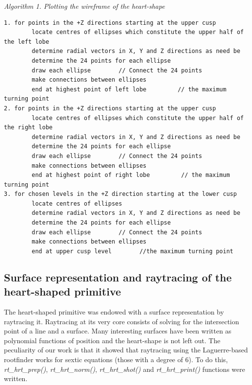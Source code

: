\hspace{50} \textit{Algorithm 1. Plotting the wireframe of the heart­-shape }
\footnotesize{\begin{verbatim}
1. for points in the +Z directions starting at the upper cusp 
        locate centres of ellipses which constitute the upper half of the left lobe 
        determine radial vectors in X, Y and Z directions as need be 
        determine the 24 points for each ellipse 
        draw each ellipse        // Connect the 24 points 
        make connections between ellipses 
        end at highest point of left lobe         // the maximum turning point 
2. for points in the +Z directions starting at the upper cusp 
        locate centres of ellipses which constitute the upper half of the right lobe 
        determine radial vectors in X, Y and Z directions as need be 
        determine the 24 points for each ellipse 
        draw each ellipse        // Connect the 24 points 
        make connections between ellipses 
        end at highest point of right lobe         // the maximum turning point   
3. for chosen levels in the +Z direction starting at the lower cusp 
        locate centres of ellipses 
        determine radial vectors in X, Y and Z directions as need be 
        determine the 24 points for each ellipse 
        draw each ellipse        // Connect the 24 points 
        make connections between ellipses
        end at upper cusp level        //the maximum turning point 
\end{verbatim}}

\normalsize

\subsection{Surface   representation   and   raytracing   of   the   heart­-shaped primitive}

\hspace{30} The   heart-­shaped   primitive was  endowed   with   a   surface   representation   by  
raytracing   it.   Ray­tracing   at   its   very   core   consists   of   solving   for   the   intersection  
point   of   a   line   and   a   surface.   Many   interesting   surfaces   have   been   written   as  
polynomial   functions   of   position   and   the   heart­-shape   is   not   left   out.   The  
peculiarity   of   our   work   is   that   it  showed   that   ray­tracing   using   the  
Laguerre­-based   root­finder   works   for   sextic   equations   (those   with   a   degree   of  
6). To   do   this,  \textit{rt\_hrt\_prep()},   \textit{rt\_hrt\_norm()},   \textit{rt\_hrt\_shot()}   and  
\textit{rt\_hrt\_print()} functions were written.


